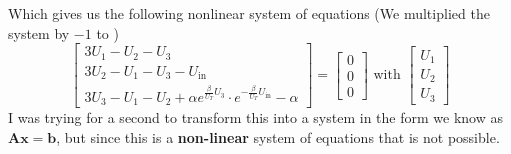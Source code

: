 \documentclass{article}
\begin{document}
Which gives us the following nonlinear system of equations (We multiplied the system by $-1$ to )
\begin{equation*}
    \begin{bmatrix}
    3U_{1} - U_{2} - U_{3} \\
    3U_{2} - U_{1} - U_{3} - U_{\text{in}} \\
    3U_{3} - U_{1} - U_{2}  + \alpha e^{\frac{\beta}{U_{T}}U_{3}} \cdot e^{-\frac{\beta}{U_{T}}U_{\text{in}}} - \alpha
    \end{bmatrix} = 
    \begin{bmatrix}
        0 \\ 0 \\ 0
    \end{bmatrix} \text{ with } \begin{bmatrix}
        U_{1} \\
        U_{2} \\
        U_{3}
        \end{bmatrix}
\end{equation*}
I was trying for a second to transform this into a system in the form we know as $\mathbf{A}\mathbf{x} = \mathbf{b}$, but since this is a \textbf{non-linear} system of equations that is not possible.
\end{document}
